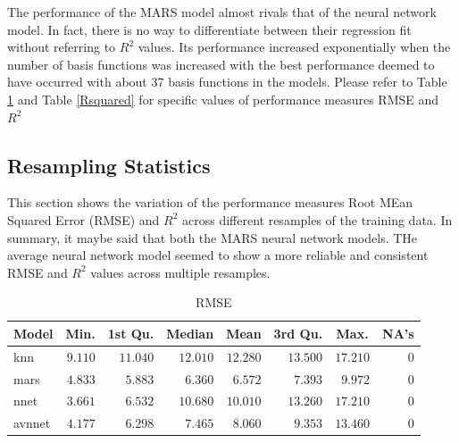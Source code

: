 \documentclass[letterpaper,12pt,titlepage,oneside,final]{report}
\begin{document}
            The performance of the MARS model almost rivals that of the neural network model. In fact, there is no way to differentiate between their regression fit without referring to $R^2$ values. Its performance increased exponentially when the number of basis functions was increased with the best performance deemed to have occurred with about 37 basis functions in the models. Please refer to Table \ref{RMSE} and Table \ref{Rsquared} for specific values of performance measures RMSE and $R^2$

        \subsection {Resampling Statistics}
            This section shows the variation of the performance measures Root MEan Squared Error (RMSE) and $R^2$ across different resamples of the training data. In summary, it maybe said that both the MARS neural network models. THe average neural network model seemed to show a more reliable and consistent RMSE and $R^2$ values across multiple resamples.
            \begin{table}[!hp]
                \begin{center}
                \begin{tabular}{lrrrrrrr}
                \hline\hline
                \multicolumn{1}{l}{Model}&\multicolumn{1}{c}{Min.}&\multicolumn{1}{c}{1st Qu.}&\multicolumn{1}{c}{Median}&\multicolumn{1}{c}{Mean}&\multicolumn{1}{c}{3rd Qu.}&\multicolumn{1}{c}{Max.}&\multicolumn{1}{c}{NA's}\tabularnewline
                \hline
                knn&$9.110$&$11.040$&$12.010$&$12.280$&$13.500$&$17.210$&$0$\tabularnewline
                mars&$4.833$&$ 5.883$&$ 6.360$&$ 6.572$&$ 7.393$&$ 9.972$&$0$\tabularnewline
                nnet&$3.661$&$ 6.532$&$10.680$&$10.010$&$13.260$&$17.210$&$0$\tabularnewline
                avnnet&$4.177$&$ 6.298$&$ 7.465$&$ 8.060$&$ 9.353$&$13.460$&$0$\tabularnewline
                \hline
                \end{tabular}\end{center}
                \caption{RMSE\label{RMSE}} 
                \end{table}
\end{document}
